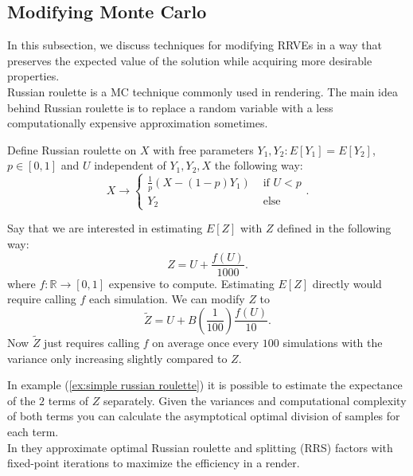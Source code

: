 \documentclass[a4paper,12pt]{article}
\begin{document}
\subsection{Modifying Monte Carlo}
In this subsection, we discuss techniques for modifying RRVEs
in a way that preserves the expected value of the solution while
acquiring more desirable properties. \\

Russian roulette is a MC technique commonly used in rendering.
The main idea behind Russian roulette is to replace a random variable
with a less computationally expensive approximation sometimes.

\begin{definition} \label{Russian roulette}
    Define Russian roulette on $X$ with free parameters
    $Y_{1},Y_{2}: E[Y_{1}] = E[Y_{2}]$, $p \in [0,1]$ and $U$
    independent of $Y_{1},Y_{2},X$ the following way:
    \begin{equation}
        X \rightarrow \begin{cases}
            \frac{1}{p}(X- (1-p)Y_{1}) & \text{ if } U<p \\
            Y_{2}                      & \text{ else }
        \end{cases}.
    \end{equation}
\end{definition}

\begin{example} \label{ex:simple russian roulette}
    Say that we are interested in estimating $E[Z]$ with $Z$
    defined in the following way:
    \begin{equation}
        Z = U + \frac{f(U)}{1000}.
    \end{equation}
    where $f:\mathbb{R} \rightarrow [0,1]$ expensive to compute.
    Estimating $E[Z]$ directly would require calling $f$ each
    simulation. We can modify $Z$ to
    \begin{equation}
        \tilde{Z} = U + B\left(\frac{1}{100}\right)\frac{f(U)}{10}.
    \end{equation}
    Now $\tilde{Z}$
    just requires calling $f$ on average once every $100$ simulations with the variance
    only increasing slightly compared to $Z$. \\

\end{example}

\begin{related}
    In example (\ref{ex:simple russian roulette}) it is possible to estimate
    the expectance of the $2$ terms of $Z$ separately. Given the variances and
    computational complexity  of both terms you can calculate the asymptotical optimal
    division of samples for each term. \\
    In \cite{rath_ears_2022} they approximate optimal Russian roulette and splitting
    (RRS) factors with fixed-point iterations to maximize the efficiency in a render.
\end{related}
\end{document}
